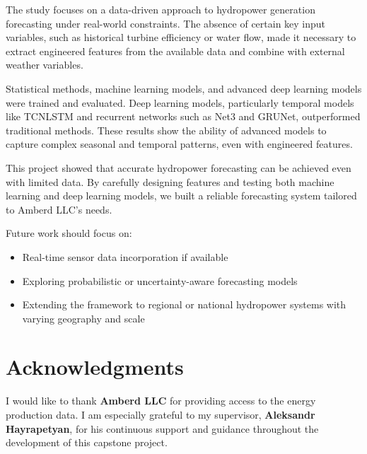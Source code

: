 \documentclass[12pt]{article}
\begin{document}
The study focuses on a data-driven approach to hydropower generation forecasting under real-world constraints. The absence of certain key input variables, such as historical turbine efficiency or water flow, made it necessary to extract engineered features from the available data and combine with external weather variables.

Statistical methods, machine learning models, and advanced deep learning models were trained and evaluated. Deep learning models, particularly temporal models like TCNLSTM and recurrent networks such as Net3 and GRUNet, outperformed traditional methods. These results show the ability of advanced models to capture complex seasonal and temporal patterns, even with engineered features.

This project showed that accurate hydropower forecasting can be achieved even with limited data. By carefully designing features and testing both machine learning and deep learning models, we built a reliable forecasting system tailored to Amberd LLC’s needs.


Future work should focus on:
\begin{itemize}
    \item Real-time sensor data incorporation if available
    \item Exploring probabilistic or uncertainty-aware forecasting models
    \item Extending the framework to regional or national hydropower systems with varying geography and scale
\end{itemize}

\section*{Acknowledgments}
\label{sec:acknowledgments}
I would like to thank \textbf{Amberd LLC} for providing access to the energy production data. I am especially grateful to my supervisor, \textbf{Aleksandr Hayrapetyan}, for his continuous support and guidance throughout the development of this capstone project.

\newpage
\end{document}
